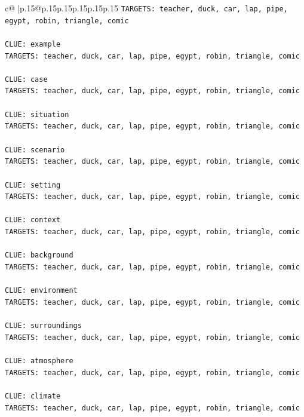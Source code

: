 \documentclass{article}
\begin{document}
{\begin{supertabular}{c@{$\;$}|p{.15\linewidth}@{}p{.15\linewidth}p{.15\linewidth}p{.15\linewidth}p{.15\linewidth}p{.15\linewidth}}
{{{\texttt{TARGETS: teacher, duck, car, lap, pipe, egypt, robin, triangle, comic} \\
\\ 
\texttt{CLUE: example} \\
\texttt{TARGETS: teacher, duck, car, lap, pipe, egypt, robin, triangle, comic} \\
\\ 
\texttt{CLUE: case} \\
\texttt{TARGETS: teacher, duck, car, lap, pipe, egypt, robin, triangle, comic} \\
\\ 
\texttt{CLUE: situation} \\
\texttt{TARGETS: teacher, duck, car, lap, pipe, egypt, robin, triangle, comic} \\
\\ 
\texttt{CLUE: scenario} \\
\texttt{TARGETS: teacher, duck, car, lap, pipe, egypt, robin, triangle, comic} \\
\\ 
\texttt{CLUE: setting} \\
\texttt{TARGETS: teacher, duck, car, lap, pipe, egypt, robin, triangle, comic} \\
\\ 
\texttt{CLUE: context} \\
\texttt{TARGETS: teacher, duck, car, lap, pipe, egypt, robin, triangle, comic} \\
\\ 
\texttt{CLUE: background} \\
\texttt{TARGETS: teacher, duck, car, lap, pipe, egypt, robin, triangle, comic} \\
\\ 
\texttt{CLUE: environment} \\
\texttt{TARGETS: teacher, duck, car, lap, pipe, egypt, robin, triangle, comic} \\
\\ 
\texttt{CLUE: surroundings} \\
\texttt{TARGETS: teacher, duck, car, lap, pipe, egypt, robin, triangle, comic} \\
\\ 
\texttt{CLUE: atmosphere} \\
\texttt{TARGETS: teacher, duck, car, lap, pipe, egypt, robin, triangle, comic} \\
\\ 
\texttt{CLUE: climate} \\
\texttt{TARGETS: teacher, duck, car, lap, pipe, egypt, robin, triangle, comic} \\
}}}
\end{supertabular}}
\end{document}
